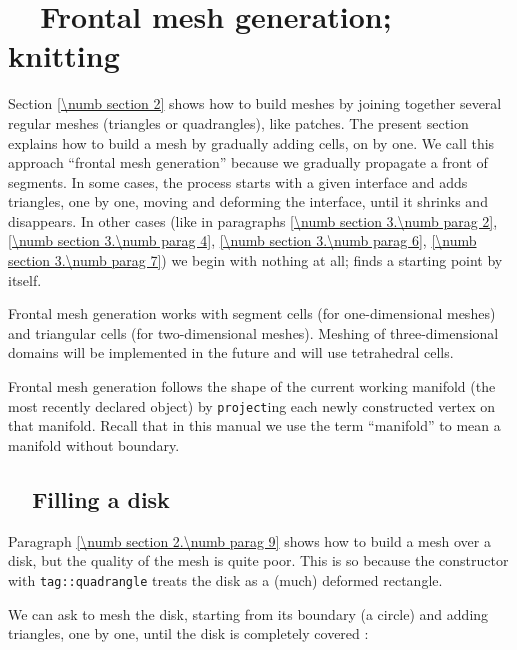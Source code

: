 
\chapter{~~Frontal mesh generation; knitting}\label{\numb section 3}

Section \ref{\numb section 2} shows how to build meshes by joining together several regular meshes
(triangles or quadrangles), like patches.
The present section explains how to build a mesh by gradually adding cells, on by one.
We call this approach ``frontal mesh generation'' because we gradually propagate a front of segments.
In some cases, the process starts with a given interface and adds triangles, one by one,
moving and deforming the interface, until it shrinks and disappears.
In other cases (like in paragraphs \ref{\numb section 3.\numb parag 2},
\ref{\numb section 3.\numb parag 4}, \ref{\numb section 3.\numb parag 6},
\ref{\numb section 3.\numb parag 7}) we begin with nothing at all;
{\maniFEM} finds a starting point by itself.

Frontal mesh generation works with segment cells (for one-dimensional meshes) and
triangular cells (for two-dimensional meshes).
Meshing of three-dimensional domains will be implemented in the future and will use tetrahedral
cells.

Frontal mesh generation follows the shape of the current working manifold (the most recently
declared {\small\tt{}} object) by {\small\tt project}ing each newly constructed vertex
on that manifold.
Recall that in this manual we use the term ``manifold'' to mean a manifold without boundary.


\section{~~Filling a disk}\label{\numb section 3.\numb parag 1}

Paragraph \ref{\numb section 2.\numb parag 9} shows how to build a mesh over a disk,
but the quality of the mesh is quite poor.
This is so because the {\small\tt{}} constructor with
{\small\tt\textcolor{tag}{tag}::quadrangle} treats the disk as a (much) deformed rectangle.

We can ask {\maniFEM} to mesh the disk, starting from its boundary (a circle)
and adding triangles, one by one, until the disk is completely covered :

